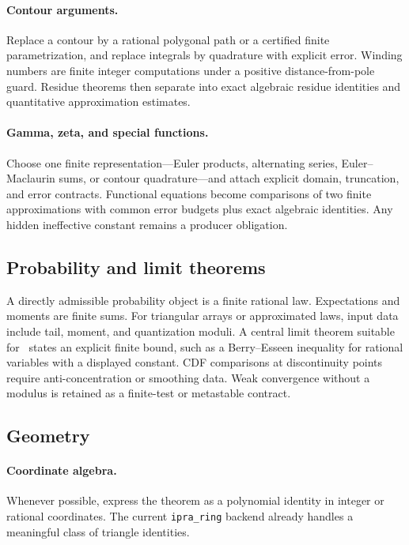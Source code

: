 \paragraph{Contour arguments.}
Replace a contour by a rational polygonal path or a certified finite parametrization, and replace integrals by quadrature with explicit error.  Winding numbers are finite integer computations under a positive distance-from-pole guard.  Residue theorems then separate into exact algebraic residue identities and quantitative approximation estimates.

\paragraph{Gamma, zeta, and special functions.}
Choose one finite representation---Euler products, alternating series, Euler--Maclaurin sums, or contour quadrature---and attach explicit domain, truncation, and error contracts.  Functional equations become comparisons of two finite approximations with common error budgets plus exact algebraic identities.  Any hidden ineffective constant remains a producer obligation.

\subsection{Probability and limit theorems}

A directly admissible probability object is a finite rational law.  Expectations and moments are finite sums.  For triangular arrays or approximated laws, input data include tail, moment, and quantization moduli.  A central limit theorem suitable for \iPRA\ states an explicit finite bound, such as a Berry--Esseen inequality for rational variables with a displayed constant.  CDF comparisons at discontinuity points require anti-concentration or smoothing data.  Weak convergence without a modulus is retained as a finite-test or metastable contract.

\subsection{Geometry}

\paragraph{Coordinate algebra.}
Whenever possible, express the theorem as a polynomial identity in integer or rational coordinates.  The current \texttt{ipra\_ring} backend already handles a meaningful class of triangle identities.

